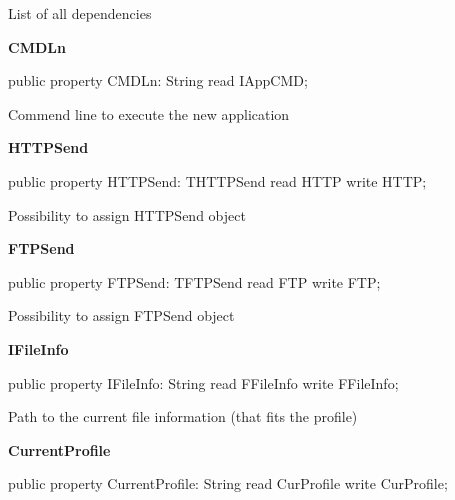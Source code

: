 \documentclass{report}
\newif\ifpdf
\begin{document}
\begin{list}{}
\begin{flushleft}
\ifpdf
\end{flushleft}
\fi


\par List of all dependencies\label{ipkhandle.TInstallation-CMDLn}
\item[\textbf{CMDLn}\hfill]
\ifpdf
\begin{flushleft}
\fi
\begin{ttfamily}
public property CMDLn: String read IAppCMD;\end{ttfamily}

\ifpdf
\end{flushleft}
\fi


\par Commend line to execute the new application\label{ipkhandle.TInstallation-HTTPSend}
\item[\textbf{HTTPSend}\hfill]
\ifpdf
\begin{flushleft}
\fi
\begin{ttfamily}
public property HTTPSend: THTTPSend read HTTP write HTTP;\end{ttfamily}

\ifpdf
\end{flushleft}
\fi


\par Possibility to assign HTTPSend object\label{ipkhandle.TInstallation-FTPSend}
\item[\textbf{FTPSend}\hfill]
\ifpdf
\begin{flushleft}
\fi
\begin{ttfamily}
public property FTPSend: TFTPSend read FTP write FTP;\end{ttfamily}

\ifpdf
\end{flushleft}
\fi


\par Possibility to assign FTPSend object\label{ipkhandle.TInstallation-IFileInfo}
\item[\textbf{IFileInfo}\hfill]
\ifpdf
\begin{flushleft}
\fi
\begin{ttfamily}
public property IFileInfo: String read FFileInfo write FFileInfo;\end{ttfamily}

\ifpdf
\end{flushleft}
\fi


\par Path to the current file information (that fits the profile)\label{ipkhandle.TInstallation-CurrentProfile}
\item[\textbf{CurrentProfile}\hfill]
\ifpdf
\begin{flushleft}
\fi
\begin{ttfamily}
public property CurrentProfile: String read CurProfile write CurProfile;\end{ttfamily}


\end{flushleft}
\end{list}
\end{document}
